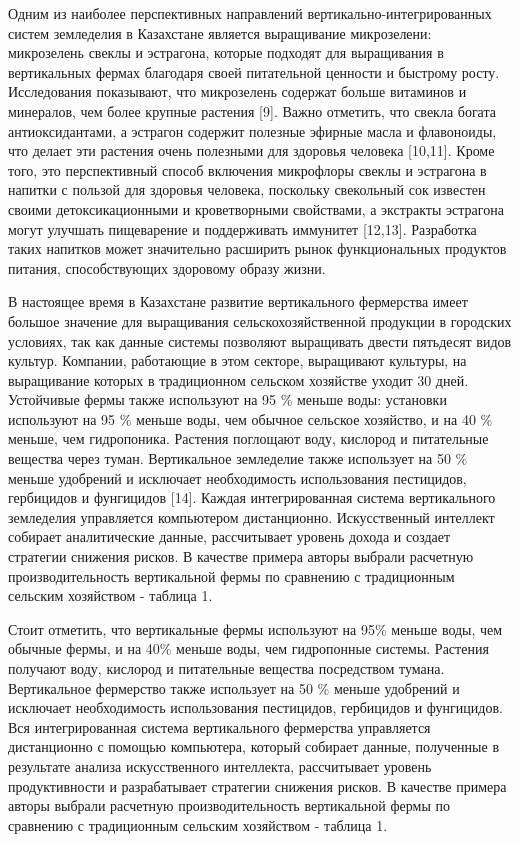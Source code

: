 Одним из наиболее перспективных направлений вертикально-интегрированных
систем земледелия в Казахстане является выращивание микрозелени:
микрозелень свеклы и эстрагона, которые подходят для выращивания в
вертикальных фермах благодаря своей питательной ценности и быстрому
росту. Исследования показывают, что микрозелень содержат больше
витаминов и минералов, чем более крупные растения {[}9{]}. Важно
отметить, что свекла богата антиоксидантами, а эстрагон содержит
полезные эфирные масла и флавоноиды, что делает эти растения очень
полезными для здоровья человека {[}10,11{]}. Кроме того, это
перспективный способ включения микрофлоры свеклы и эстрагона в напитки с
пользой для здоровья человека, поскольку свекольный сок известен своими
детоксикационными и кроветворными свойствами, а экстракты эстрагона
могут улучшать пищеварение и поддерживать иммунитет {[}12,13{]}.
Разработка таких напитков может значительно расширить рынок
функциональных продуктов питания, способствующих здоровому образу жизни.

В настоящее время в Казахстане развитие вертикального фермерства имеет
большое значение для выращивания сельскохозяйственной продукции в
городских условиях, так как данные системы позволяют выращивать двести
пятьдесят видов культур. Компании, работающие в этом секторе, выращивают
культуры, на выращивание которых в традиционном сельском хозяйстве
уходит 30 дней. Устойчивые фермы также используют на 95 \% меньше воды:
установки используют на 95 \% меньше воды, чем обычное сельское
хозяйство, и на 40 \% меньше, чем гидропоника. Растения поглощают воду,
кислород и питательные вещества через туман. Вертикальное земледелие
также использует на 50 \% меньше удобрений и исключает необходимость
использования пестицидов, гербицидов и фунгицидов {[}14{]}. Каждая
интегрированная система вертикального земледелия управляется компьютером
дистанционно. Искусственный интеллект собирает аналитические данные,
рассчитывает уровень дохода и создает стратегии снижения рисков. В
качестве примера авторы выбрали расчетную производительность
вертикальной фермы по сравнению с традиционным сельским хозяйством -
таблица 1.

Стоит отметить, что вертикальные фермы используют на 95\% меньше воды,
чем обычные фермы, и на 40\% меньше воды, чем гидропонные системы.
Растения получают воду, кислород и питательные вещества посредством
тумана. Вертикальное фермерство также использует на 50 \% меньше
удобрений и исключает необходимость использования пестицидов, гербицидов
и фунгицидов. Вся интегрированная система вертикального фермерства
управляется дистанционно с помощью компьютера, который собирает данные,
полученные в результате анализа искусственного интеллекта, рассчитывает
уровень продуктивности и разрабатывает стратегии снижения рисков. В
качестве примера авторы выбрали расчетную производительность
вертикальной фермы по сравнению с традиционным сельским хозяйством -
таблица 1.

